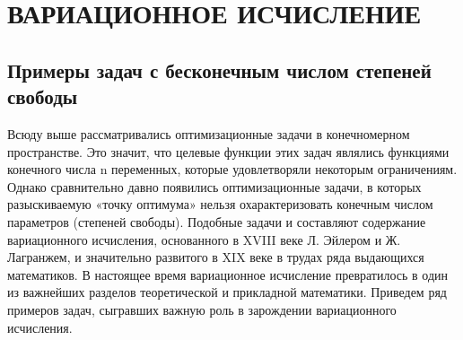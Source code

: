	\section{ВАРИАЦИОННОЕ ИСЧИСЛЕНИЕ}
	\subsection{Примеры задач с бесконечным числом степеней свободы}

	Всюду выше рассматривались оптимизационные задачи в конечномерном пространстве. Это значит, что целевые функции этих задач являлись функциями конечного числа n переменных, которые удовлетворяли некоторым ограничениям. Однако сравнительно давно появились оптимизационные задачи, в которых разыскиваемую «точку оптимума» нельзя охарактеризовать конечным числом параметров (степеней свободы). Подобные задачи и составляют содержание вариационного исчисления, основанного в XVIII веке Л. Эйлером и Ж. Лагранжем, и значительно развитого в XIX веке в трудах ряда выдающихся математиков. В настоящее время вариационное исчисление превратилось в один из важнейших разделов теоретической и прикладной математики. Приведем ряд примеров задач, сыгравших важную роль в зарождении вариационного исчисления.

